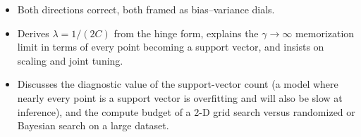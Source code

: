 \begin{interviewq}

\goodgreat
\begin{itemize}
    \item {} Both directions correct, both framed as bias--variance dials.
    \item {} Derives $\lambda=1/(2C)$ from the hinge form, explains the $\gamma\to\infty$ memorization limit in terms of every point becoming a support vector, and insists on scaling and joint tuning.
    \item {} Discusses the diagnostic value of the support-vector count (a model where nearly every point is a support vector is overfitting and will also be slow at inference), and the compute budget of a 2-D grid search versus randomized or Bayesian search on a large dataset.
\end{itemize}

\end{interviewq}


